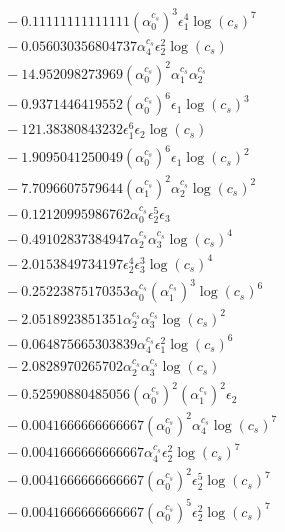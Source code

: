 \documentclass[10pt]{article}
\begin{document}
\begin{align*}
&{}  - 0.11111111111111 \left(\alpha_{0}^{c_s}\right)^{3} \epsilon_{1}^{4} \log{\left(c_{s} \right)}^{7} \\
&{}  - 0.056030356804737 \alpha_{4}^{c_s} \epsilon_{2}^{2} \log{\left(c_{s} \right)} \\
&{}  - 14.952098273969 \left(\alpha_{0}^{c_s}\right)^{2} \alpha_{1}^{c_s} \alpha_{2}^{c_s} \\
&{}  - 0.9371446419552 \left(\alpha_{0}^{c_s}\right)^{6} \epsilon_{1} \log{\left(c_{s} \right)}^{3} \\
&{}  - 121.38380843232 \epsilon_{1}^{6} \epsilon_{2} \log{\left(c_{s} \right)} \\
&{}  - 1.9095041250049 \left(\alpha_{0}^{c_s}\right)^{6} \epsilon_{1} \log{\left(c_{s} \right)}^{2} \\
&{}  - 7.7096607579644 \left(\alpha_{1}^{c_s}\right)^{2} \alpha_{2}^{c_s} \log{\left(c_{s} \right)}^{2} \\
&{}  - 0.12120995986762 \alpha_{0}^{c_s} \epsilon_{2}^{5} \epsilon_{3} \\
&{}  - 0.49102837384947 \alpha_{2}^{c_s} \alpha_{3}^{c_s} \log{\left(c_{s} \right)}^{4} \\
&{}  - 2.0153849734197 \epsilon_{2}^{4} \epsilon_{3}^{3} \log{\left(c_{s} \right)}^{4} \\
&{}  - 0.25223875170353 \alpha_{0}^{c_s} \left(\alpha_{1}^{c_s}\right)^{3} \log{\left(c_{s} \right)}^{6} \\
&{}  - 2.0518923851351 \alpha_{2}^{c_s} \alpha_{3}^{c_s} \log{\left(c_{s} \right)}^{2} \\
&{}  - 0.064875665303839 \alpha_{4}^{c_s} \epsilon_{1}^{2} \log{\left(c_{s} \right)}^{6} \\
&{}  - 2.0828970265702 \alpha_{2}^{c_s} \alpha_{3}^{c_s} \log{\left(c_{s} \right)} \\
&{}  - 0.52590880485056 \left(\alpha_{0}^{c_s}\right)^{2} \left(\alpha_{1}^{c_s}\right)^{2} \epsilon_{2} \\
&{}  - 0.0041666666666667 \left(\alpha_{0}^{c_s}\right)^{2} \alpha_{4}^{c_s} \log{\left(c_{s} \right)}^{7} \\
&{}  - 0.0041666666666667 \alpha_{4}^{c_s} \epsilon_{2}^{2} \log{\left(c_{s} \right)}^{7} \\
&{}  - 0.0041666666666667 \left(\alpha_{0}^{c_s}\right)^{2} \epsilon_{2}^{5} \log{\left(c_{s} \right)}^{7} \\
&{}  - 0.0041666666666667 \left(\alpha_{0}^{c_s}\right)^{5} \epsilon_{2}^{2} \log{\left(c_{s} \right)}^{7} \\

\end{align*}
\end{document}
